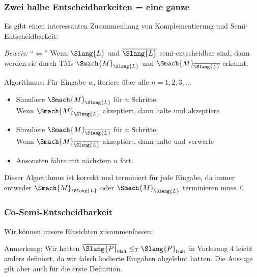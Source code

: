 \documentclass[aspectratio=1610,onlymath]{beamer}
\begin{document}
\begin{frame}[t]\frametitle{Zwei halbe Entscheidbarkeiten = eine ganze}

Es gibt einen interessanten Zusammenhang von Komplementierung und Semi-Entscheidbarkeit:\\[1ex]


\emph{Beweis:} "`$\Leftarrow$"' Wenn $\Slang{L}$ und $\overline{\Slang{L}}$ semi-entscheidbar sind, dann werden sie durch TMs $\Smach{M}_{\Slang{L}}$ und
$\Smach{M}_{\overline{\Slang{L}}}$ erkannt.\pause\medskip

Algorithmus: Für Eingabe $w$, iteriere über alle $n=1,2,3,\ldots$
\begin{itemize}
\item Simuliere $\Smach{M}_{\Slang{L}}$ für $n$ Schritte:\\
	Wenn $\Smach{M}_{\Slang{L}}$ akzeptiert, dann halte und akzeptiere
\item Simuliere $\Smach{M}_{\overline{\Slang{L}}}$ für $n$ Schritte:\\
	Wenn $\Smach{M}_{\overline{\Slang{L}}}$ akzeptiert, dann halte und verwerfe
\item Ansonsten fahre mit nächstem $n$ fort.
\end{itemize}
Dieser Algorithmus ist korrekt und terminiert für jede Eingabe, da immer
entweder $\Smach{M}_{\Slang{L}}$ oder
$\Smach{M}_{\overline{\Slang{L}}}$ terminieren muss.\qed

\end{frame}

\begin{frame}\frametitle{Co-Semi-Entscheidbarkeit}

Wir können unsere Einsichten zusammenfassen:\bigskip

\bigskip\pause


{\footnotesize
\textcolor{devilscss}{Anmerkung: Wir hatten $\overline{\Slang{P}}_{\textsf{Halt}}\leq_T \Slang{P}_{\textsf{Halt}}$ in Vorlesung 4 leicht anders definiert, da wir falsch kodierte Eingaben abgelehnt hatten. Die Aussage gilt aber auch für die erste Definition.}

}

\end{frame}
\end{document}
